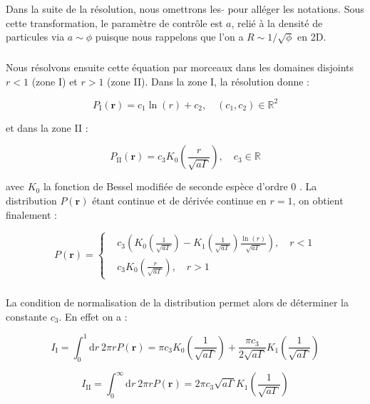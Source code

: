 \noindent Dans la suite de la résolution, nous omettrons les $\tilde{}$ pour alléger les notations. Sous cette transformation, le paramètre de contrôle est $a$, relié à la densité de particules via $a\sim \phi$ puisque nous rappelons que l'on a $R\sim 1/\sqrt{\phi}$ en 2D.

\subparagraph{}Nous résolvons ensuite cette équation par morceaux dans les domaines disjoints $r<1$ (zone I) et $r>1$ (zone II). Dans la zone I, la résolution donne :

\begin{equation}
	P_\text{I}(\mathbf{r}) = c_1 \ln (r) + c_2, \quad (c_1, c_2) \in \mathbb{R}^2
\end{equation}

\noindent et dans la zone II :

\begin{equation}
	P_\text{II}(\mathbf{r}) = c_3 K_0\left( \frac{r}{\sqrt{a\Gamma}} \right), \quad c_3 \in \mathbb{R}
\end{equation}

\noindent avec $K_0$ la fonction de Bessel modifiée de seconde espèce d'ordre 0 \cite{abramowitz_handbook_1965}. La distribution $P(\mathbf{r})$ étant continue et de dérivée continue en $r=1$, on obtient finalement :

\begin{equation}
P(\mathbf{r}) = \left\{
    \begin{aligned}
    & c_3 \left( K_0\left( \frac{1}{\sqrt{a\Gamma}} \right) -K_1\left( \frac{1}{\sqrt{a\Gamma}} \right)\frac{\ln (r)}{\sqrt{a\Gamma}}\right), \quad r<1\\
    & c_3 K_0\left( \frac{r}{\sqrt{a\Gamma}} \right), \quad r>1
    \end{aligned}
    \right.
\end{equation}

\subparagraph{}La condition de normalisation de la distribution permet alors de déterminer la constante $c_3$. En effet on a :

\begin{equation}
	I_\text{I} = \int_0^1 \mathrm{d}r~ 2\pi r P(\mathbf{r}) = \pi c_3 K_0\left( \frac{1}{\sqrt{a\Gamma}} \right) + \frac{\pi c_3}{2\sqrt{a\Gamma}}K_1\left( \frac{1}{\sqrt{a\Gamma}} \right)
\end{equation}

\begin{equation}
	I_\text{II} = \int_0^\infty \mathrm{d}r~ 2\pi r P(\mathbf{r}) = 2\pi c_3 \sqrt{a\Gamma}K_1\left( \frac{1}{\sqrt{a\Gamma}} \right)
\end{equation}

